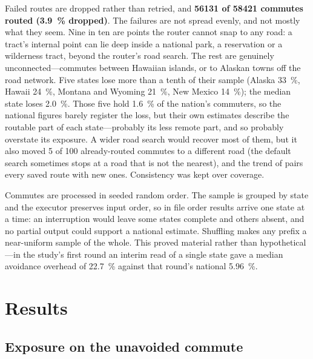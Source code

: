 \documentclass[11pt,twoside]{article}
\begin{document}
Failed routes are dropped rather than retried, and \textbf{\num{56131} of \num{58421}
commutes routed (\SI{3.9}{\percent} dropped)}. The failures are not spread evenly, and not
mostly what they seem. Nine in ten are points the router cannot snap to any road: a tract's
internal point can lie deep inside a national park, a reservation or a wilderness tract,
beyond the router's road search. The rest are genuinely unconnected---commutes between
Hawaiian islands, or to Alaskan towns off the road network. Five states lose more than a
tenth of their sample (Alaska \SI{33}{\percent}, Hawaii \SI{24}{\percent}, Montana and
Wyoming \SI{21}{\percent}, New Mexico \SI{14}{\percent}); the median state loses
\SI{2.0}{\percent}. Those five hold \SI{1.6}{\percent} of the nation's commuters, so the
national figures barely register the loss, but their own estimates describe the routable
part of each state---probably its less remote part, and so probably overstate its
exposure. A wider road search would recover most of them, but it also moved 5 of 100
already-routed commutes to a different road (the default search sometimes stops at a road
that is not the nearest), and the trend of  pairs every saved route
with new ones. Consistency was kept over coverage.

Commutes are processed in seeded random order. The sample is grouped by state and the
executor preserves input order, so in file order results arrive one state at a time: an
interruption would leave some states complete and others absent, and no partial output
could support a national estimate. Shuffling makes any prefix a near-uniform sample of the
whole. This proved material rather than hypothetical---in the study's first round an
interim read of a single state gave a median avoidance overhead of \SI{22.7}{\percent}
against that round's national \SI{5.96}{\percent}.

\section{Results}
\label{sec:results}

\subsection{Exposure on the unavoided commute}
\label{sec:results:exposure}
\end{document}
